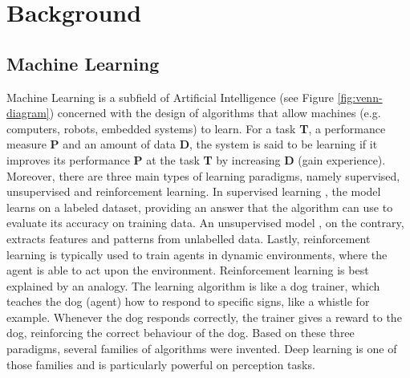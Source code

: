 \chapter{Background} 
\label{chapter-background} 


\section{Machine Learning}
Machine Learning is a subfield of Artificial Intelligence (see Figure \ref{fig:venn-diagram}) concerned with the design of algorithms that allow machines (e.g. computers, robots, embedded systems) to learn. For a task \textbf{T}, a performance measure \textbf{P} and an amount of data \textbf{D}, the system is said to be learning if it improves its performance \textbf{P} at the task \textbf{T} by increasing \textbf{D} (gain experience). Moreover, there are three main types of learning paradigms, namely supervised, unsupervised and reinforcement learning. In supervised learning \citep{supervised}, the model learns on a labeled dataset, providing an answer that the algorithm can use to evaluate its accuracy on training data. An unsupervised model \citep{unsupervised}, on the contrary, extracts features and patterns from unlabelled data. Lastly, reinforcement learning \citep{reinforcement} is typically used to train agents in dynamic environments, where the agent is able to act upon the environment. Reinforcement learning is best explained by an analogy. The learning algorithm is like a dog trainer, which teaches the dog (agent) how to respond to specific signs, like a whistle for example. Whenever the dog responds correctly, the trainer gives a reward to the dog, reinforcing the correct behaviour of the dog. Based on these three paradigms, several families of algorithms were invented. Deep learning \citep{deeplearning-overview} is one of those families and is particularly powerful on perception tasks.
